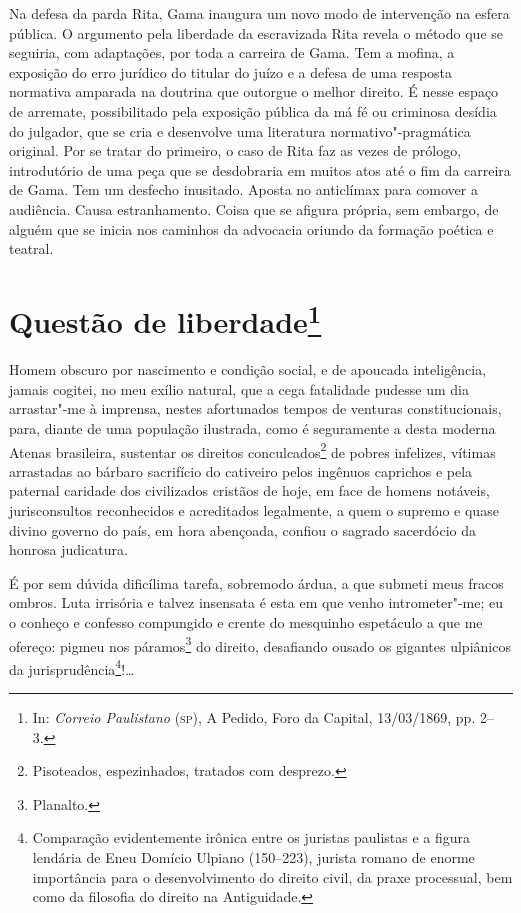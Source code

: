 \@openrighttrue\makeatother \endgroup

\paginabranca
\mbox{}\vfill
\thispagestyle{empty}

{\small\noindent
Na defesa da parda Rita, Gama inaugura um novo modo de intervenção
na esfera pública. O argumento pela liberdade da escravizada Rita revela
o método que se seguiria, com adaptações, por toda a carreira de Gama.
Tem a mofina, a exposição do erro jurídico do titular do juízo e a
defesa de uma resposta normativa amparada na doutrina que outorgue o
melhor direito. É nesse espaço de arremate, possibilitado
pela exposição pública da má fé ou criminosa desídia do julgador, que se
cria e desenvolve uma literatura normativo"-pragmática original. Por se
tratar do primeiro, o caso de Rita faz as vezes de prólogo, introdutório
de uma peça que se desdobraria em muitos atos até o fim da carreira de
Gama. Tem um desfecho inusitado. Aposta no anticlímax para comover a
audiência. Causa estranhamento. Coisa que se afigura própria, sem
embargo, de alguém que se inicia nos caminhos da advocacia oriundo da
formação poética e teatral. }

\chapter{Questão de liberdade\footnote[*]{In: \emph{Correio
  Paulistano} (\textsc{sp}), A Pedido, Foro da Capital, 13/03/1869, pp. 2--3.}}

Homem obscuro por nascimento e condição social, e de apoucada
inteligência, jamais cogitei, no meu exílio natural, que a cega
fatalidade pudesse um dia arrastar"-me à imprensa, nestes afortunados
tempos de venturas constitucionais, para, diante de uma população
ilustrada, como é seguramente a desta moderna Atenas brasileira,
sustentar os direitos conculcados\footnote{Pisoteados, espezinhados,
  tratados com desprezo.} de pobres infelizes, vítimas arrastadas ao
bárbaro sacrifício do cativeiro pelos ingênuos caprichos e pela paternal
caridade dos civilizados cristãos de hoje, em face de homens notáveis,
jurisconsultos reconhecidos e acreditados legalmente, a quem o supremo e
quase divino governo do país, em hora abençoada, confiou o sagrado
sacerdócio da honrosa judicatura.

É por sem dúvida dificílima tarefa, sobremodo árdua, a que submeti meus
fracos ombros. Luta irrisória e talvez insensata é esta em que venho
intrometer"-me; eu o conheço e confesso compungido e crente do mesquinho
espetáculo a que me ofereço: pigmeu nos páramos\footnote{Planalto.} do
direito, desafiando ousado os gigantes ulpiânicos da
jurisprudência\footnote{Comparação evidentemente irônica entre os
  juristas paulistas e a figura lendária de Eneu Domício Ulpiano
  (150--223), jurista romano de enorme importância para o desenvolvimento
  do direito civil, da praxe processual, bem como da filosofia do
  direito na Antiguidade.}!\ldots{}

